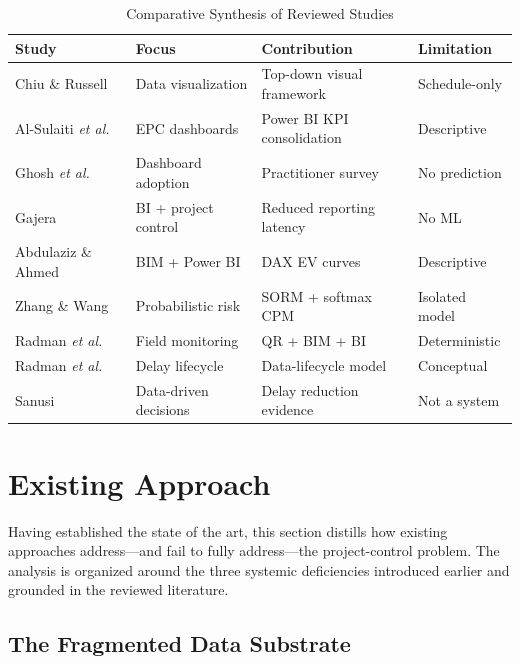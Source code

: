 \documentclass[conference]{IEEEtran}
\begin{document}
\begin{table}[t]
\caption{Comparative Synthesis of Reviewed Studies}
\label{tab:lit}
\centering
\scriptsize
\setlength{\tabcolsep}{3pt}
\begin{tabular}{@{}p{1.45cm}p{1.75cm}p{1.85cm}p{1.15cm}@{}}
\toprule
\textbf{Study} & \textbf{Focus} & \textbf{Contribution} & \textbf{Limitation} \\
\midrule
Chiu \& Russell~\cite{chiu2011design} & Data visualization & Top-down visual framework & Schedule-only \\
Al-Sulaiti \emph{et al.}~\cite{alsulaiti2021using} & EPC dashboards & Power BI KPI consolidation & Descriptive \\
Ghosh \emph{et al.}~\cite{ghosh2024use} & Dashboard adoption & Practitioner survey & No prediction \\
Gajera~\cite{gajera2023integrating} & BI + project control & Reduced reporting latency & No ML \\
Abdulaziz \& Ahmed~\cite{abdulaziz2026customized} & BIM + Power BI & DAX EV curves & Descriptive \\
Zhang \& Wang~\cite{zhang2023quantifying} & Probabilistic risk & SORM + softmax CPM & Isolated model \\
Radman \emph{et al.}~\cite{radman2026realcons} & Field monitoring & QR + BIM + BI & Deterministic \\
Radman \emph{et al.}~\cite{radman2022digital} & Delay lifecycle & Data-lifecycle model & Conceptual \\
Sanusi~\cite{sanusi2024role} & Data-driven decisions & Delay reduction evidence & Not a system \\
\bottomrule
\end{tabular}
\end{table}

\section{Existing Approach}

Having established the state of the art, this section distills how existing approaches address---and fail to fully address---the project-control problem. The analysis is organized around the three systemic deficiencies introduced earlier and grounded in the reviewed literature.

\subsection{The Fragmented Data Substrate}
\end{document}

